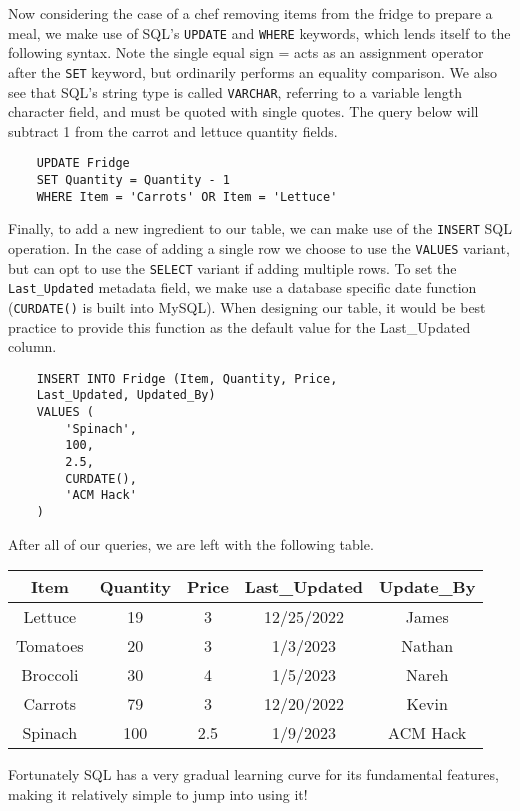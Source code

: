 \begin{kaobox}[title=Working with SQL]
    Now considering the case of a chef removing items from the fridge to prepare a meal, we make use of SQL's \texttt{UPDATE} and \texttt{WHERE} keywords, which lends itself to the following syntax. Note the single equal sign = acts as an assignment operator after the \texttt{SET} keyword, but ordinarily performs an equality comparison. We also see that SQL's string type is called \texttt{VARCHAR}, referring to a variable length character field, and must be quoted with single quotes. The query below will subtract 1 from the carrot and lettuce quantity fields.

    \begin{verbatim}
    UPDATE Fridge
    SET Quantity = Quantity - 1
    WHERE Item = 'Carrots' OR Item = 'Lettuce'
    \end{verbatim}
    
    Finally, to add a new ingredient to our table, we can make use of the \texttt{INSERT} SQL operation. In the case of adding a single row we choose to use the \texttt{VALUES} variant, but can opt to use the \texttt{SELECT} variant if adding multiple rows. To set the \texttt{Last\_Updated} metadata field, we make use a database specific date function (\texttt{CURDATE()} is built into MySQL). When designing our table, it would be best practice to provide this function as the default value for the Last\_Updated column.

    \begin{verbatim}
    INSERT INTO Fridge (Item, Quantity, Price,
    Last_Updated, Updated_By)
    VALUES (
        'Spinach',
        100,
        2.5,
        CURDATE(),
        'ACM Hack'
    )
    \end{verbatim}
    
    After all of our queries, we are left with the following table.

    \begin{center}
        \begin{tabular}{ |c|c|c|c|c| } 
            \hline
            \textbf{Item} & \textbf{Quantity} & \textbf{Price} & \textbf{Last\_Updated} & \textbf{Update\_By} \\ 
            \hline
            Lettuce & 19 & 3 & 12/25/2022 & James \\ 
            \hline
            Tomatoes & 20 & 3 & 1/3/2023 & Nathan \\ 
            \hline
            Broccoli & 30 & 4 & 1/5/2023 & Nareh \\ 
            \hline
            Carrots & 79 & 3 & 12/20/2022 & Kevin \\ 
            \hline
            Spinach & 100 & 2.5 & 1/9/2023 & ACM Hack \\
            \hline
        \end{tabular}
    \end{center}
    
    Fortunately SQL has a very gradual learning curve for its fundamental features, making it relatively simple to jump into using it!
\end{kaobox}

